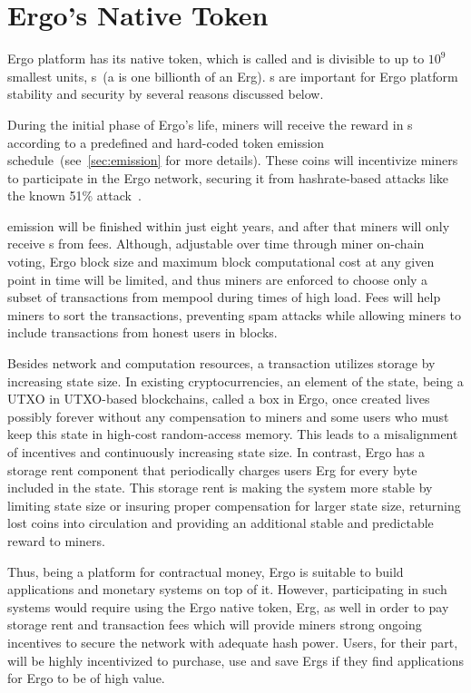 \section{Ergo's Native Token}
\label{sec:currency}

Ergo platform has its native token, which is
called \Erg{} and is divisible to up to $10^9$ smallest units, \nanoErg{}s~(a \nanoErg{} is one billionth of an Erg).
\Erg{}s are important for Ergo platform stability and security by several reasons discussed below.

During the initial phase of Ergo's life, miners will receive the reward in \Erg{}s
according to a predefined and hard-coded token emission schedule~(see~\ref{sec:emission} for more details).
These coins will incentivize miners to participate in the Ergo network, securing it from hashrate-based attacks
like the known 51\% attack~\cite{reorgAttack}.

\Erg{} emission will be finished within just eight years, and after that miners will only receive \Erg{}s from
fees.
Although, adjustable over time through miner on-chain voting, Ergo block size and maximum block computational
cost at any given point in time will be limited,
and thus miners are enforced to
choose only a subset of transactions from mempool during times of high load.
Fees will help miners to sort the transactions, preventing spam attacks while allowing miners
to include transactions from honest users in blocks.

Besides network and computation resources, a transaction utilizes storage by increasing state size.
In existing cryptocurrencies, an element of the state, being  a UTXO  in  UTXO-based  blockchains,  called  a box
in  Ergo, once created lives possibly forever without any compensation to miners and some users who must keep this state
in high-cost random-access memory. This leads to a misalignment of incentives and continuously increasing state size.
In contrast, Ergo has a storage rent component that periodically charges users Erg for every byte
included in the state.
This storage rent is making the system more stable by limiting state size or insuring proper compensation for larger
state size, returning lost coins into
circulation and providing an additional stable and predictable reward to miners.

Thus, being a platform for contractual money, Ergo is suitable to build applications and monetary systems
on top of it.
However, participating in such systems would require using the Ergo native token, Erg, as well in order to pay
storage rent and transaction fees which will provide miners strong ongoing incentives to secure the network with
adequate hash power. Users, for their part, will be highly incentivized to purchase, use and save Ergs if they
find applications for Ergo to be of high value.

